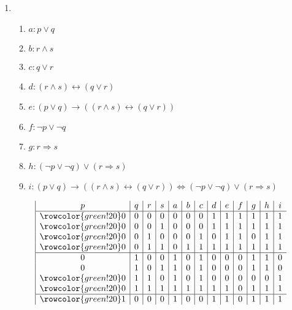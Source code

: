 \documentclass{article}
\begin{document}
\begin{enumerate}[label=(\alph*)]
\begin{enumerate}[label=\roman*.]
        \item 
        \begin{enumerate}[label={}]         
            \item $a: p\lor{}q$     
            \item $b: r\land{}s$     
            \item $c: q\lor{}r$     
            \item $d: (r\land{}s)\leftrightarrow{}(q\lor{}r)$     
            \item $e: (p\lor{}q)\rightarrow{}((r\land{}s)\leftrightarrow{}(q\lor{}r))$     
            \item $f: \lnot{}p\lor{}\lnot{}q$     
            \item $g: r\Rightarrow{}s$     
            \item $h: (\lnot{}p\lor{}\lnot{}q)\lor{}(r\Rightarrow{}s)$     
            \item $i: (p\lor{}q)\rightarrow{}((r\land{}s)\leftrightarrow{}(q\lor{}r))\Leftrightarrow{}(\lnot{}p\lor{}\lnot{}q)\lor{}(r\Rightarrow{}s)$  
        \end{enumerate}
        \begin{displaymath}
            \begin{array}{|c|c|c|c|c|c|c|c|c|c|c|c|c}
               p & q & r & s & a & b & c & d & e & f & g & h & i \\
            \hline
            \rowcolor{green!20}
            0 & 0 & 0 & 0 & 0 & 0 & 0 & 1 & 1 & 1 & 1 & 1 & 1 \\
            \rowcolor{green!20}
            0 & 0 & 0 & 1 & 0 & 0 & 0 & 1 & 1 & 1 & 1 & 1 & 1 \\
            \rowcolor{green!20}
            0 & 0 & 1 & 0 & 0 & 0 & 1 & 0 & 1 & 1 & 0 & 1 & 1 \\
            \rowcolor{green!20}
            0 & 0 & 1 & 1 & 0 & 1 & 1 & 1 & 1 & 1 & 1 & 1 & 1 \\
            \hline
            0 & 1 & 0 & 0 & 1 & 0 & 1 & 0 & 0 & 0 & 1 & 1 & 0 \\
            0 & 1 & 0 & 1 & 1 & 0 & 1 & 0 & 0 & 0 & 1 & 1 & 0 \\
            \rowcolor{green!20}
            0 & 1 & 1 & 0 & 1 & 0 & 1 & 0 & 0 & 0 & 0 & 0 & 1 \\
            \rowcolor{green!20}
            0 & 1 & 1 & 1 & 1 & 1 & 1 & 1 & 1 & 0 & 1 & 1 & 1 \\
            \hline
            \rowcolor{green!20}
            1 & 0 & 0 & 0 & 1 & 0 & 0 & 1 & 1 & 0 & 1 & 1 & 1 \\

\end{array}
\end{displaymath}
\end{enumerate}
\end{enumerate}
\end{document}
